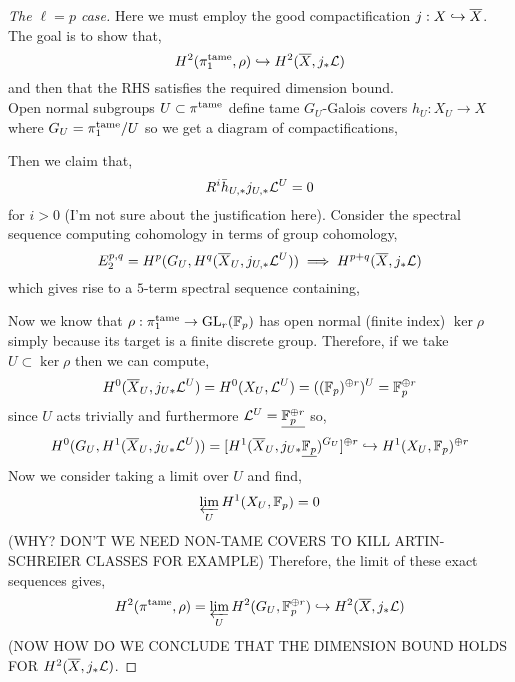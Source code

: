 \documentclass[12pt]{article}
\begin{document}
\begin{proof}[The $\ell = p$ case]
Here we must employ the good compactification $j : X \hookrightarrow \overline{X}$. The goal is to show that,
\[ H^2(\pi_1^{\mathrm{tame}}, \rho) \hookrightarrow H^2(\overline{X}, j_* \mathcal{L}) \]
and then that the RHS satisfies the required dimension bound. 
\bigskip\\
Open normal subgroups $U \subset \pi^{\mathrm{tame}}$ define tame $G_U$-Galois covers $h_U : X_U \to X$ where $G_U = \pi_1^{\mathrm{tame}} / U$ so we get a diagram of compactifications,
\begin{center}
\end{center} 
Then we claim that,
\[ R^i \bar{h}_{U, *} j_{U, *} \mathcal{L}^U = 0 \]
for $i > 0$ (I'm not sure about the justification here). Consider the spectral sequence computing \etale cohomology in terms of group cohomology,
\[ E^{p,q}_2 = H^p(G_U, H^q(\overline{X}_U, j_{U,*} \mathcal{L}^U)) \implies H^{p+q}(\overline{X}, j_* \mathcal{L}) \]
which gives rise to a $5$-term spectral sequence containing,
\begin{center}
\end{center} 
Now we know that $\rho : \pi_1^{\mathrm{tame}} \to \mathrm{GL}_r(\mathbb{F}_p)$ has open normal (finite index) $\ker{\rho}$ simply because its target is a finite discrete group. Therefore, if we take $U \subset \ker{\rho}$ then we can compute,
\[ H^0(\overline{X}_U, j_{U *} \mathcal{L}^U) = H^0(X_U, \mathcal{L}^U) = ((\mathbb{F}_p)^{\oplus r})^U = \mathbb{F}_p^{\oplus r} \] 
since $U$ acts trivially and furthermore $\mathcal{L}^U = \underline{\mathbb{F}_p^{\oplus r}}$ so, 
\[  H^0(G_U, H^1(\overline{X}_U, j_{U*} \mathcal{L}^U)) = [H^1(\overline{X}_U, j_{U*} \underline{\mathbb{F}_p})^{G_U}]^{\oplus r} \hookrightarrow H^1(X_U, \mathbb{F}_p)^{\oplus r} \]
Now we consider taking a limit over $U$ and find,
\[ \varprojlim_U H^1(X_U, \mathbb{F}_p) = 0 \]
(WHY? DON'T WE NEED NON-TAME COVERS TO KILL ARTIN-SCHREIER CLASSES FOR EXAMPLE)
Therefore, the limit of these exact sequences gives,
\[ H^2(\pi^{\mathrm{tame}}, \rho) = \varprojlim_U H^2(G_U, \mathbb{F}_p^{\oplus r}) \hookrightarrow H^2(\overline{X}, j_* \mathcal{L}) \]
(NOW HOW DO WE CONCLUDE THAT THE DIMENSION BOUND HOLDS FOR $H^2(\overline{X}, j_* \mathcal{L})$.
\end{proof}
\end{document}
